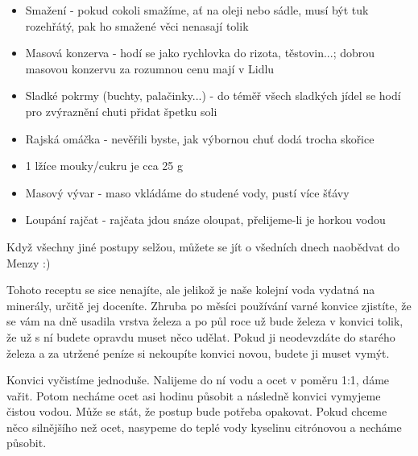 \begin{itemize}
\item Smažení - pokud cokoli smažíme, ať na oleji nebo sádle, musí být tuk
rozehřátý, pak ho smažené věci nenasají tolik
\item Masová konzerva - hodí se jako rychlovka do rizota, těstovin...; dobrou
masovou konzervu za rozumnou cenu mají v Lidlu
\item Sladké pokrmy (buchty, palačinky...) - do téměř všech sladkých jídel se
hodí pro zvýraznění chuti přidat špetku soli
\item Rajská omáčka - nevěřili byste, jak výbornou chuť dodá trocha skořice
\item 1 lžíce mouky/cukru je cca 25 g
\item Masový vývar - maso vkládáme do studené vody, pustí více šťávy
\item Loupání rajčat - rajčata jdou snáze oloupat, přelijeme-li je horkou vodou
\end{itemize}

Když všechny jiné postupy selžou, můžete se jít o všedních dnech naobědvat do
Menzy :)

Tohoto receptu se sice nenajíte, ale jelikož je naše kolejní voda vydatná na
minerály, určitě jej doceníte. Zhruba po měsíci používání varné konvice
zjistíte, že se vám na dně usadila vrstva železa a po půl roce už bude železa v
konvici tolik, že už s ní budete opravdu muset něco udělat. Pokud ji neodevzdáte
do starého železa a za utržené peníze si nekoupíte konvici novou, budete ji
muset vymýt.

Konvici vyčistíme jednoduše. Nalijeme do ní vodu a ocet v poměru 1:1, dáme
vařit. Potom necháme ocet asi hodinu působit a následně konvici vymyjeme čistou
vodou. Může se stát, že postup bude potřeba opakovat. Pokud chceme něco
silnějšího než ocet, nasypeme do teplé vody kyselinu citrónovou a necháme
působit.